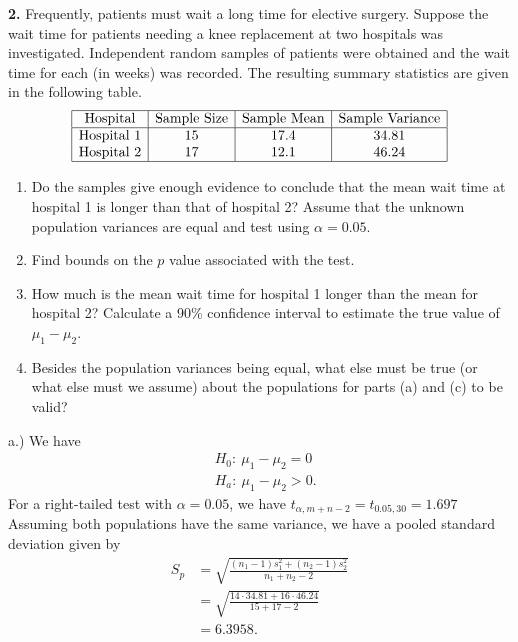 \documentclass{report}
\begin{document}
 \pagebreak \bigbreak \noindent 
 \begin{mdframed}
     \noindent \textbf{2.} Frequently, patients must wait a long time for elective surgery. Suppose the wait time for patients needing a knee replacement at two hospitals was investigated. Independent random samples of patients were obtained and the wait time for each (in weeks) was recorded. The resulting summary statistics are given in the following table.
     \[
         \begin{array}{|c|c|c|c|}
             \hline
             \text{Hospital} & \text{Sample Size} & \text{Sample Mean} & \text{Sample Variance} \\
             \hline
             \text{Hospital 1} & 15 & 17.4 & 34.81 \\
             \text{Hospital 2} & 17 & 12.1 & 46.24 \\
             \hline
         \end{array}
     \]
     \bigbreak \noindent 
     \noindent 
     \begin{enumerate}[label=(\alph*)]
         \item Do the samples give enough evidence to conclude that the mean wait time at hospital 1 is longer than that of hospital 2? Assume that the unknown population variances are equal and test using $\alpha = 0.05$.
         \item Find bounds on the $p$ value associated with the test.
         \item How much is the mean wait time for hospital 1 longer than the mean for hospital 2? Calculate a 90\% confidence interval to estimate the true value of $\mu_1 - \mu_2$.
         \item Besides the population variances being equal, what else must be true (or what else must we assume) about the populations for parts (a) and (c) to be valid?
     \end{enumerate}
 \end{mdframed}
 \bigbreak \noindent 
 a.) We have
 \begin{align*}
     &H_{0}:\ \mu_{1} - \mu_{2} = 0 \\
     &H_{a}:\ \mu_{1} - \mu_{2} > 0 
 .\end{align*}
 \bigbreak \noindent 
 For a right-tailed test with $\alpha=0.05$, we have $t_{\alpha,m+n-2} = t_{0.05,30} = 1.697 $
 \bigbreak \noindent 
 Assuming both populations have the same variance, we have a pooled standard deviation given by
 \begin{align*}
     S_{p} &= \sqrt{\frac{(n_{1}-1)s_{1}^{2} + (n_{2} - 1)s_{2}^{2}}{n_{1} + n_{2} -2}}  \\
    &= \sqrt{\frac{14 \cdot 34.81 + 16 \cdot 46.24}{15 + 17 - 2}} \\
    &=6.3958
 .\end{align*}
\end{document}
